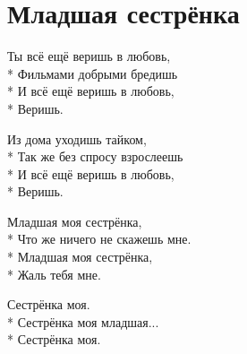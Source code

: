 \vspace{\fill}\newpage

\section{Младшая сестрёнка}
\label{song:Младшая_сестрёнка}

\medskip

\begin{minipage}{\linewidth}
Ты всё ещё веришь в любовь,\\*
Фильмами добрыми бредишь\\*
И всё ещё веришь в любовь,\\*
Веришь.\\
\end{minipage}\par\medskip\nobreak

\medskip

\begin{minipage}{\linewidth}
Из дома уходишь тайком,\\*
Так же без спросу взрослеешь\\*
И всё ещё веришь в любовь,\\*
Веришь.\\
\end{minipage}\par\medskip\nobreak

\medskip

\begin{minipage}{\linewidth}
\hspace*{1.5em}Младшая моя сестрёнка,\\*
\hspace*{1.5em}Что же ничего не скажешь мне.\\*
\hspace*{1.5em}Младшая моя сестрёнка,\\*
\hspace*{1.5em}Жаль тебя мне.\\
\end{minipage}\par\medskip\nobreak

\medskip

\begin{minipage}{\linewidth}
\hspace*{1.5em}Сестрёнка моя.\\*
\hspace*{1.5em}Сестрёнка моя младшая...\\*
\hspace*{1.5em}Сестрёнка моя.\\
\end{minipage}\par\medskip\nobreak

